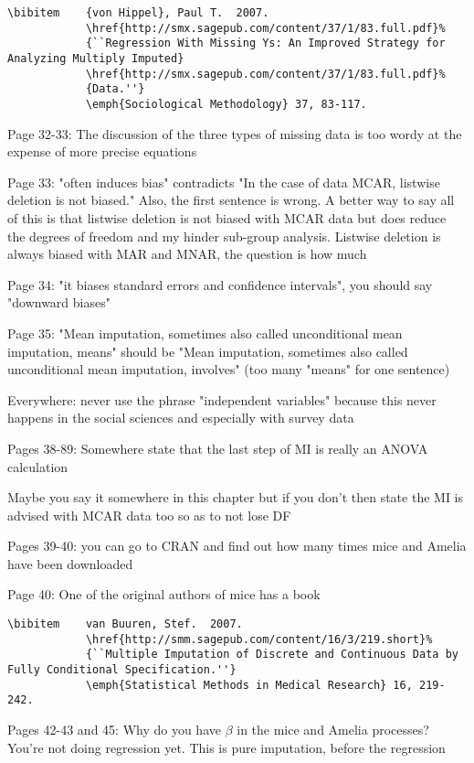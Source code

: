 \documentclass[12pt]{article}
\begin{document}
\begin{coi}
\begin{verbatim}
\bibitem    {von Hippel}, Paul T.  2007.
            \href{http://smx.sagepub.com/content/37/1/83.full.pdf}%
            {``Regression With Missing Ys: An Improved Strategy for Analyzing Multiply Imputed}
            \href{http://smx.sagepub.com/content/37/1/83.full.pdf}%
            {Data.''}
            \emph{Sociological Methodology} 37, 83-117.
\end{verbatim}
		\item Page 32-33: The discussion of the three types of missing data is too wordy at the expense of more precise equations
		\item Page 33: "often induces bias" contradicts "In the case of data MCAR, listwise deletion is not biased." Also, the first sentence is wrong. A better way to say all of this is that listwise deletion is not biased with MCAR data but does reduce the degrees of freedom and my hinder sub-group analysis. Listwise deletion is always biased with MAR and MNAR, the question is how much
		\item Page 34: "it biases standard errors and confidence intervals", you should say "downward biases"
		\item Page 35: "Mean imputation, sometimes also called unconditional mean imputation, means" should be "Mean imputation, sometimes also called unconditional mean imputation, involves" (too many "means" for one sentence)
		\item Everywhere: never use the phrase "independent variables" because this never happens in the social sciences and especially with survey data
		\item Pages 38-89: Somewhere state that the last step of MI is really an ANOVA calculation
		\item Maybe you say it somewhere in this chapter but if you don't then state the MI is advised with MCAR data too so as to not lose DF
		\item Pages 39-40: you can go to CRAN and find out how many times mice and Amelia have been downloaded
		\item Page 40: One of the original authors of mice has a book
\begin{verbatim}
\bibitem    van Buuren, Stef.  2007.
            \href{http://smm.sagepub.com/content/16/3/219.short}%
            {``Multiple Imputation of Discrete and Continuous Data by Fully Conditional Specification.''}
            \emph{Statistical Methods in Medical Research} 16, 219-242.
\end{verbatim}
		\item Pages 42-43 and 45: Why do you have $\beta$ in the mice and Amelia processes? You're not doing regression yet. This is pure imputation, before the regression

\end{coi}
\end{document}
